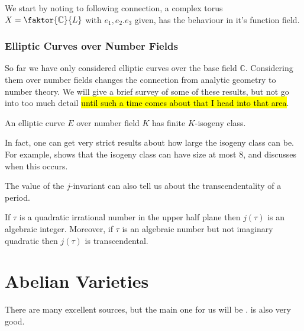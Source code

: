 \documentclass{article}
\begin{document}
We start by noting to following connection, a complex torus $X = \faktor{\mbb{C}}{L}$ with $e_1, e_2. e_3$ given, has the behaviour 
in it's function field. 

\section{Elliptic Curves over Number Fields}
So far we have only considered elliptic curves over the base field $\mathbb{C}$. Considering them over number fields changes the connection from analytic geometry to number theory. We will give a brief survey of some of these results, but not go into too much detail \hl{until such a time comes about that I head into that area}. 

\begin{theorem}
	An elliptic curve $E$ over number field $K$ has finite $K$-isogeny class. 
\end{theorem}

In fact, one can get very strict results about how large the isogeny class can be. For example, \cite{Kenku1982} shows that the isogeny class can have size at most 8, and discusses when this occurs. 


The value of the $j$-invariant can also tell us about the transcendentality of a period. 

\begin{theorem}
	If $\tau$ is a quadratic irrational number in the upper half plane then $j(\tau)$ is an algebraic integer. Moreover, if $\tau$ is an algebraic number but not imaginary quadratic then $j(\tau)$ is transcendental.
\end{theorem}

\part{Abelian Varieties}

There are many excellent sources, but the main one for us will be \cite{Birkenhake2004}. \cite{Beauville2011} is also very good. 
\end{document}
